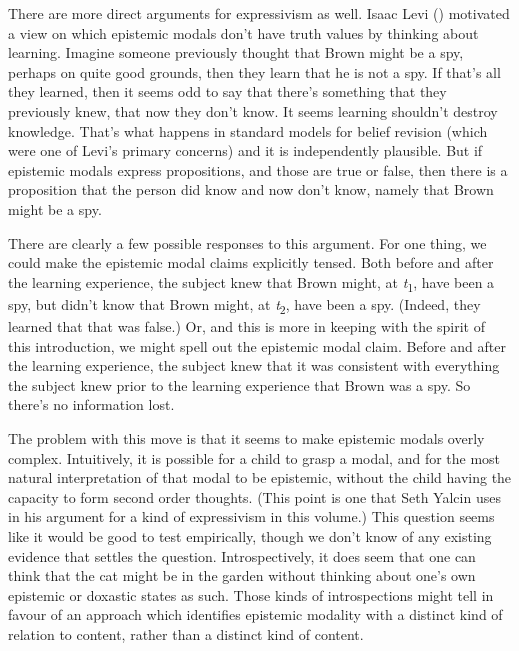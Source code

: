 \documentclass[
  11pt,
  letterpaper,
  DIV=11,
  numbers=noendperiod,
  twoside]{scrartcl}
\begin{document}
There are more direct arguments for expressivism as well. Isaac Levi
() motivated a view on which epistemic
modals don't have truth values by thinking about learning. Imagine
someone previously thought that Brown might be a spy, perhaps on quite
good grounds, then they learn that he is not a spy. If that's all they
learned, then it seems odd to say that there's something that they
previously knew, that now they don't know. It seems learning shouldn't
destroy knowledge. That's what happens in standard models for belief
revision (which were one of Levi's primary concerns) and it is
independently plausible. But if epistemic modals express propositions,
and those are true or false, then there is a proposition that the person
did know and now don't know, namely that Brown might be a spy.

There are clearly a few possible responses to this argument. For one
thing, we could make the epistemic modal claims explicitly tensed. Both
before and after the learning experience, the subject knew that Brown
might, at \emph{t}\textsubscript{1}, have been a spy, but didn't know
that Brown might, at \emph{t}\textsubscript{2}, have been a spy.
(Indeed, they learned that that was false.) Or, and this is more in
keeping with the spirit of this introduction, we might spell out the
epistemic modal claim. Before and after the learning experience, the
subject knew that it was consistent with everything the subject knew
prior to the learning experience that Brown was a spy. So there's no
information lost.

The problem with this move is that it seems to make epistemic modals
overly complex. Intuitively, it is possible for a child to grasp a
modal, and for the most natural interpretation of that modal to be
epistemic, without the child having the capacity to form second order
thoughts. (This point is one that Seth Yalcin uses in his argument for a
kind of expressivism in this volume.) This question seems like it would
be good to test empirically, though we don't know of any existing
evidence that settles the question. Introspectively, it does seem that
one can think that the cat might be in the garden without thinking about
one's own epistemic or doxastic states as such. Those kinds of
introspections might tell in favour of an approach which identifies
epistemic modality with a distinct kind of relation to content, rather
than a distinct kind of content.
\end{document}
